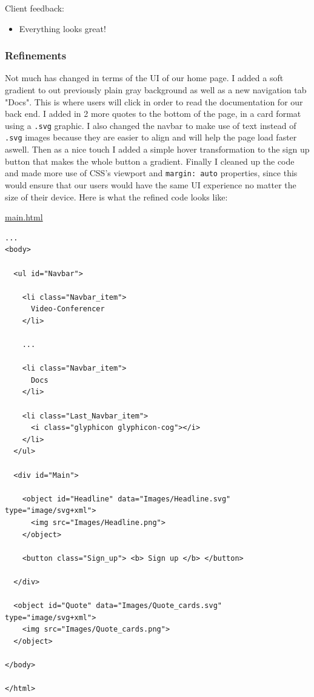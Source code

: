 {\color{gray} \hrulefill} \vspace{0.2cm}

{\sffamily Client feedback:}

\begin{itemize}
  \item Everything looks great!
\end{itemize}

{\color{gray} \hrulefill} 

\subsubsection{Refinements}

Not much has changed in terms of the UI of our home 
page. I added a soft gradient to out previously plain 
gray background as well as a new navigation tab "Docs".
This is where users will click in order to read the 
documentation for our back end. I added in 2 
more quotes to the bottom of the page, in a card 
format using a \texttt{.svg} graphic. I also changed 
the navbar to make use of text instead of 
\texttt{.svg} images because they are easier to align 
and will help the page load faster aswell. Then as a nice 
touch I added a simple hover transformation to the sign up 
button that makes the whole button a gradient. Finally I 
cleaned up the code and made more use of CSS's 
viewport and \texttt{margin: auto} properties, since
this would ensure that our users would have the same
UI experience no matter the size of their device. Here 
is what the refined code looks like: \\ \vspace{0.2cm}

\underline{main.html}

\begin{verbatim}
...
<body>
   
  <ul id="Navbar">

    <li class="Navbar_item">
      Video-Conferencer 
    </li>

    ...

    <li class="Navbar_item">
      Docs
    </li>

    <li class="Last_Navbar_item">
      <i class="glyphicon glyphicon-cog"></i>
    </li>
  </ul>

  <div id="Main">

    <object id="Headline" data="Images/Headline.svg" type="image/svg+xml">
      <img src="Images/Headline.png">
    </object>
	
    <button class="Sign_up"> <b> Sign up </b> </button> 

  </div>

  <object id="Quote" data="Images/Quote_cards.svg" type="image/svg+xml">
    <img src="Images/Quote_cards.png">
  </object>

</body>

</html>
\end{verbatim}

